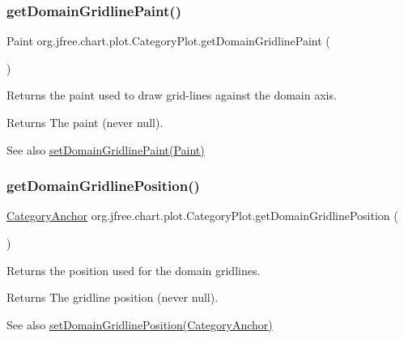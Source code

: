 \subsubsection{\texorpdfstring{get\+Domain\+Gridline\+Paint()}{getDomainGridlinePaint()}}
{\footnotesize\ttfamily Paint org.\+jfree.\+chart.\+plot.\+Category\+Plot.\+get\+Domain\+Gridline\+Paint (\begin{DoxyParamCaption}{ }\end{DoxyParamCaption})}

Returns the paint used to draw grid-\/lines against the domain axis.

\begin{DoxyReturn}{Returns}
The paint (never {\ttfamily null}).
\end{DoxyReturn}
\begin{DoxySeeAlso}{See also}
\mbox{\hyperlink{classorg_1_1jfree_1_1chart_1_1plot_1_1_category_plot_ad40d88e79916f70d4b3f52905440c941}{set\+Domain\+Gridline\+Paint(\+Paint)}} 
\end{DoxySeeAlso}
\mbox{\label{classorg_1_1jfree_1_1chart_1_1plot_1_1_category_plot_a030d3c1500bfe6fe212be4f25e149405}} 
\subsubsection{\texorpdfstring{get\+Domain\+Gridline\+Position()}{getDomainGridlinePosition()}}
{\footnotesize\ttfamily \mbox{\hyperlink{classorg_1_1jfree_1_1chart_1_1axis_1_1_category_anchor}{Category\+Anchor}} org.\+jfree.\+chart.\+plot.\+Category\+Plot.\+get\+Domain\+Gridline\+Position (\begin{DoxyParamCaption}{ }\end{DoxyParamCaption})}

Returns the position used for the domain gridlines.

\begin{DoxyReturn}{Returns}
The gridline position (never {\ttfamily null}).
\end{DoxyReturn}
\begin{DoxySeeAlso}{See also}
\mbox{\hyperlink{classorg_1_1jfree_1_1chart_1_1plot_1_1_category_plot_a3a98acbf2d67788bfd36f4e9fa1c2c67}{set\+Domain\+Gridline\+Position(\+Category\+Anchor)}} 
\end{DoxySeeAlso}
\mbox{\label{classorg_1_1jfree_1_1chart_1_1plot_1_1_category_plot_a3ea6085f3ef4c8c76c1e2ed9e8f6650b}} 
